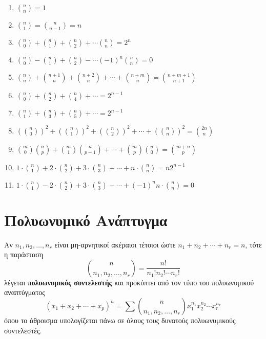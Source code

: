 \begin{enumerate}
\item $\binom{n}{n}=1$
\item $\binom{n}{1}=\binom{n}{n-1}=n$
\item $\binom{n}{0}+\binom{n}{1}+\binom{n}{2}+\cdots\binom{n}{n}=2^{n}$
\item $\binom{n}{0}-\binom{n}{1}+\binom{n}{2}-\cdots (-1)^{n}\binom{n}{n}=0$
\item $\binom{n}{n}+\binom{n+1}{n}+\binom{n+2}{n}+\cdots+\binom{n+m}{n}=\binom{n+m+1}{n+1}$
\item $\binom{n}{0}+\binom{n}{2}+\binom{n}{4}+\cdots=2^{n-1}$
\item $\binom{n}{1}+\binom{n}{3}+\binom{n}{5}+\cdots=2^{n-1}$
\item $(\binom{n}{0})^{2}+(\binom{n}{1})^{2}+(\binom{n}{2})^{2}+\cdots+(\binom{n}{n})^{2}=\binom{2n}{n}$
\item $\binom{m}{0}\binom{n}{p}+\binom{m}{1}\binom{n}{p-1}+\cdots+\binom{m}{p}\binom{n}{0}=\binom{m+n}{p}$
\item $1\cdot\binom{n}{1}+2\cdot\binom{n}{2}+3\cdot\binom{n}{3}+\cdots+n\cdot\binom{n}{n}=n2^{n-1}$
\item $1\cdot\binom{n}{1}-2\cdot\binom{n}{2}+3\cdot\binom{n}{3}-\cdots+(-1)^{n}n\cdot\binom{n}{n}=0$
\end{enumerate}

\section{Πολυωνυμικό Ανάπτυγμα}

Αν $n_{1}, n_{2}, \ldots, n_{r}$ είναι μη-αρνητικοί ακέραιοι τέτοιοι ώστε $n_{1}+n_{2}+\cdots+n_{r}=n$, τότε η παράσταση
\[
\binom{n}{n_{1},n_{2},\ldots,n_{r}}=\frac{n!}{n_{1}! n_{2}! \cdots n_{r}!}
\]
λέγεται \textbf{\color{blue} πολυωνυμικός συντελεστής} και προκύπτει από τον τύπο του πολυωνυμικού αναπτύγματος
\[
(x_{1}+x_{2}+\cdots+x_{p})^{n}=\sum\binom{n}{n_{1},n_{2},\ldots,n_{r}}x_{1}^{n_{1}}x_{2}^{n_{2}}\cdots x_{r}^{n_{r}}
\]
όπου το άθροισμα υπολογίζεται πάνω σε όλους τους δυνατούς πολυωνυμικούς συντελεστές.
